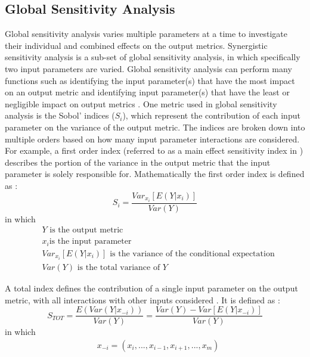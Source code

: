 \subsection{Global Sensitivity Analysis}
Global sensitivity analysis varies multiple parameters at a time to 
investigate their individual and combined effects on the output metrics. 
Synergistic sensitivity analysis is a sub-set of global sensitivity 
analysis, in which specifically two input parameters are varied.
Global sensitivity analysis can perform many functions such as identifying 
the input 
parameter(s) that have the most impact on an output metric and identifying 
input parameter(s) that have the least or negligible impact on output 
metrics \cite{thiolliere_methodology_2018}. One metric used 
in global sensitivity analysis is the Sobol' indices ($S_{i}$), which 
represent the 
contribution of each input parameter on the variance of the output metric.
The indices are broken down into multiple orders based on how many 
input parameter interactions are considered. For example, a first order 
index (referred to as a main effect sensitivity index in 
\cite{adams_dakota_2019}) describes the 
portion of the variance in the output metric that the input parameter is 
solely 
responsible for. Mathematically the first order index is defined as  
\cite{adams_dakota_2019}:
\begin{equation}
    S_i = \frac{Var_{x_i}[E(Y|x_i)]}{Var(Y)}
\end{equation}
in which 
\begin{align*}
    &Y \text{ is the output metric} \\
    &x_i \text {is the input parameter}\\
    &Var_{x_i}[E(Y|x_i)] \text{ is the variance of the conditional expectation}\\
    &Var(Y) \text{ is the total variance of } Y
\end{align*}

\noindent A total index defines the contribution of a
single input parameter on the output metric, with all interactions with other 
inputs considered \cite{adams_dakota_2019}. It is defined as 
\cite{adams_dakota_2019}:
\begin{equation}
    S_{TOT} = \frac{E(Var(Y|x_{-i}))}{Var(Y)} = \frac{Var(Y) - Var[E(Y|x_{-i})]}{Var(Y)}
\end{equation}
in which 
\begin{align*}
    &x_{-i} = (x_i,...,x_{i-1}, x_{i+1},...,x_m)
\end{align*}

